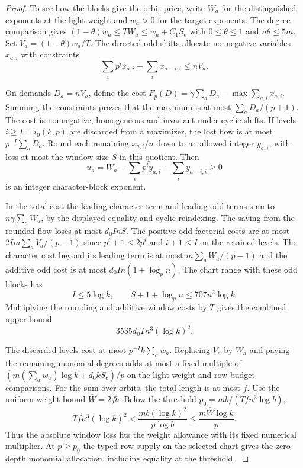 \begin{proof}
To see how the blocks give the orbit price, write \(W_a\)
for the distinguished exponents at the light weight and
\(w_a>0\) for the target exponents. The degree comparison
gives \((1-\theta)w_a\le T W_a\le w_a+C_1S_e\) with
\(0\le\theta\le1\) and \(n\theta\le5m\).
Set \(V_a=(1-\theta)w_a/T\).
The directed odd shifts allocate nonnegative variables
\(x_{a,i}\) with constraints
\[
         \sum_i p^i x_{a,i}+\sum_i x_{a-i,i}\le nV_a .
\]

On demands \(D_a=nV_a\), define the cost
\(F_p(D)=\gamma\sum_a D_a-\max\sum_{a,i}x_{a,i}\).
Summing the constraints proves that the maximum is at
most \(\sum_a D_a/(p+1)\). The cost is nonnegative,
homogeneous and invariant under cyclic shifts.
If levels \(i\ge I=i_0(k,p)\) are discarded from a
maximizer, the lost flow is at most \(p^{-I}\sum_aD_a\).
Round each remaining \(x_{a,i}/n\) down to an allowed
integer \(y_{a,i}\), with loss at most the window size
\(S\) in this quotient. Then
\[
 u_a=W_a-\sum_i p^i y_{a,i}-\sum_i y_{a-i,i}\ge0
\]
is an integer character-block exponent.

In the total cost
the leading character term and leading odd terms sum to
\(n\gamma\sum_a W_a\), by the displayed equality and
cyclic reindexing. The saving from the rounded flow loses
at most \(d_0 I n S\). The positive odd factorial costs
are at most \(2I m\sum_a V_a/(p-1)\) since
\(p^i+1\le2p^i\) and \(i+1\le I\) on the retained levels.
The character cost beyond its leading term is at most
\(m\sum_aW_a/(p-1)\) and the additive odd cost is at most
\(d_0 I n(1+\log_p n)\).
The chart range with these odd blocks has
\[
 I\le5\log k,\qquad S+1+\log_p n\le707 n^2\log k.
\]
Multiplying the rounding and additive window costs by \(T\) gives the combined upper bound
\[
     3535 d_0 Tn^3(\log k)^2 .
\]

The discarded levels cost at most
\(p^{-I}k\sum_a w_a\).
Replacing \(V_a\) by \(W_a\) and paying the remaining
monomial degrees adds at most a fixed multiple of
\((m(\sum_a w_a)\log k+d_0 kS_e)/p\) on the light-weight
and row-budget comparisons. For the sum over orbits, the total
length is at most \(f\). Use the uniform weight bound
\(\widehat W=2fb\). Below the threshold
\(p_0=mb/(Tf n^3\log b)\),
\[
 Tf n^3(\log k)^2
 < \frac{mb(\log k)^2}{p\log b}
 \le \frac{m\widehat W\log k}{p}.
\]
Thus the absolute window loss fits the weight allowance with
its fixed numerical multiplier. At \(p\ge p_0\) the typed row
supply on the selected chart gives the zero-depth monomial
allocation, including equality at the threshold.
\label{cor:slice-unscaled-depth-8}


\end{proof}
